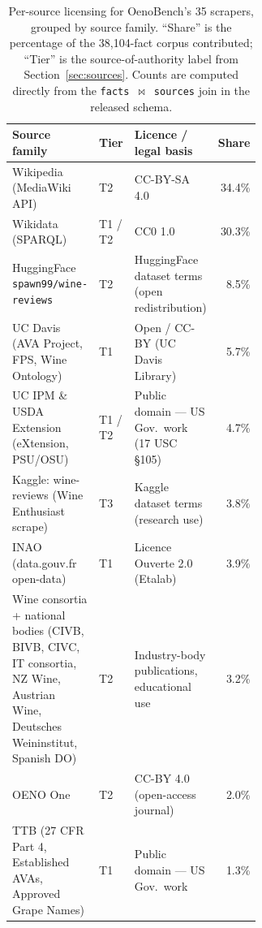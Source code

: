 \begin{table}[h]
  \centering
  \footnotesize
  \caption{Per-source licensing for OenoBench's 35 scrapers, grouped by
    source family. ``Share'' is the percentage of the 38{,}104-fact
    corpus contributed; ``Tier'' is the source-of-authority label from
    Section~\ref{sec:sources}. Counts are computed directly from the
    \texttt{facts}~$\bowtie$~\texttt{sources} join in the released
    schema.}
  \label{tab:licensing}
  \begin{tabular}{p{0.31\linewidth}lp{0.30\linewidth}r}
    \toprule
    Source family & Tier & Licence / legal basis & Share \\
    \midrule
    Wikipedia (MediaWiki API)                                            & T2          & CC-BY-SA 4.0                                           & 34.4\% \\
    Wikidata (SPARQL)                                                    & T1 / T2     & CC0 1.0                                                & 30.3\% \\
    HuggingFace \texttt{spawn99/wine-reviews}                            & T2          & HuggingFace dataset terms (open redistribution)        &  8.5\% \\
    UC Davis (AVA Project, FPS, Wine Ontology)                           & T1          & Open / CC-BY (UC Davis Library)                        &  5.7\% \\
    UC IPM \& USDA Extension (eXtension, PSU/OSU)                        & T1 / T2     & Public domain --- US Gov.\ work (17 USC \S105)         &  4.7\% \\
    Kaggle: wine-reviews (Wine Enthusiast scrape)                        & T3          & Kaggle dataset terms (research use)                    &  3.8\% \\
    INAO (data.gouv.fr open-data)                                        & T1          & Licence Ouverte 2.0 (Etalab)                           &  3.9\% \\
    Wine consortia + national bodies (CIVB, BIVB, CIVC, IT consortia, NZ Wine, Austrian Wine, Deutsches Weininstitut, Spanish DO) & T2 & Industry-body publications, educational use & 3.2\% \\
    OENO One                                                             & T2          & CC-BY 4.0 (open-access journal)                        &  2.0\% \\
    TTB (27 CFR Part 4, Established AVAs, Approved Grape Names)          & T1          & Public domain --- US Gov.\ work                        &  1.3\% \\

\end{tabular}
\end{table}
